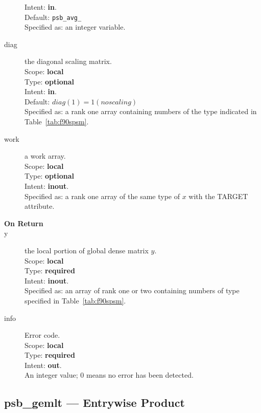 \begin{description}
Intent: {\bf in}.\\
Default: \verb|psb_avg_|\\	
Specified as: an integer variable.
\item[diag] the diagonal scaling matrix.\\
Scope: {\bf local} \\
Type: {\bf optional}\\	
Intent: {\bf in}.\\
Default: $diag(1) = 1 (no scaling)$\\	
Specified as: a rank one  array containing numbers of the type
indicated in Table~\ref{tab:f90spsm}.
\item[work] a work array. \\
Scope: {\bf local} \\
Type: {\bf optional}\\	
Intent: {\bf inout}.\\
Specified as: a rank one array of the same type of $x$ with the
TARGET attribute. 

\item[\bf On Return] 
\item[y] the local portion of global dense matrix
$y$. %
\\
Scope: {\bf local} \\
Type: {\bf required} \\
Intent: {\bf inout}.\\
Specified as: an array of rank one or two
containing numbers of type specified in
Table~\ref{tab:f90spsm}.
\item[info] Error code.\\
Scope: {\bf local} \\
Type: {\bf required} \\
Intent: {\bf out}.\\
An integer value; 0 means no error has been detected. 
\end{description}

%
%


\clearpage\subsection{psb\_gemlt --- Entrywise Product}

